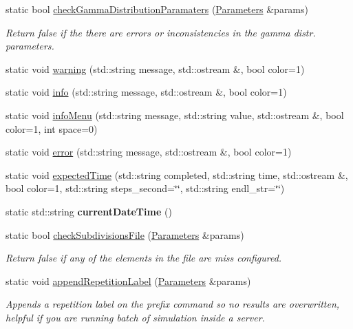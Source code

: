 \begin{DoxyCompactItemize}
static bool \hyperlink{class_sim_errno_aa997e9bec44280eec04ce320f8d75031}{check\+Gamma\+Distribution\+Paramaters} (\hyperlink{class_parameters}{Parameters} \&params)
\begin{DoxyCompactList}\small\item\em Return false if the there are errors or inconsistencies in the gamma distr. parameters. \end{DoxyCompactList}\item 
static void \hyperlink{class_sim_errno_acd92c1f938453f86e5f6d6967ed09754}{warning} (std\+::string message, std\+::ostream \&, bool color=1)
\item 
static void \hyperlink{class_sim_errno_aef262fffecd567fe6ebcf57aed23e8dd}{info} (std\+::string message, std\+::ostream \&, bool color=1)
\item 
static void \hyperlink{class_sim_errno_aafbfe0b71883701a1c8882135c54cfe4}{info\+Menu} (std\+::string message, std\+::string value, std\+::ostream \&, bool color=1, int space=0)
\item 
static void \hyperlink{class_sim_errno_a1d49dc3d396b355aee645c6d35436aa9}{error} (std\+::string message, std\+::ostream \&, bool color=1)
\item 
static void \hyperlink{class_sim_errno_a786ea76043026ad10aec48bc81137144}{expected\+Time} (std\+::string completed, std\+::string time, std\+::ostream \&, bool color=1, std\+::string steps\+\_\+second=\char`\"{}\char`\"{}, std\+::string endl\+\_\+str=\char`\"{}\char`\"{})
\item 
\mbox{\label{class_sim_errno_a5f21f4c97adee0132d4d64b30b89fecd}} 
static std\+::string {\bfseries current\+Date\+Time} ()
\item 
static bool \hyperlink{class_sim_errno_a71e44ab51c81191171464b1371887844}{check\+Subdivisions\+File} (\hyperlink{class_parameters}{Parameters} \&params)
\begin{DoxyCompactList}\small\item\em Return false if any of the elements in the file are miss configured. \end{DoxyCompactList}\item 
static void \hyperlink{class_sim_errno_a3dfc14a69998cff0ee82f8bb6ef2ddc4}{append\+Repetition\+Label} (\hyperlink{class_parameters}{Parameters} \&params)
\begin{DoxyCompactList}\small\item\em Appends a repetition label on the prefix command so no results are overwritten, helpful if you are running batch of simulation inside a server. \end{DoxyCompactList}\end{DoxyCompactItemize}


